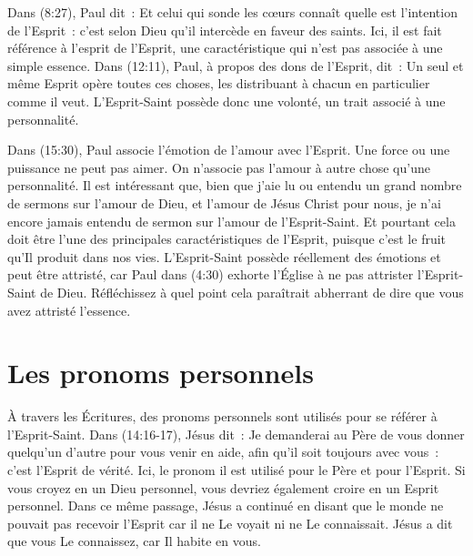 Dans (8:27), Paul dit~: \og Et celui qui sonde les cœurs
 connaît quelle est l'intention de l'Esprit~: c'est selon Dieu qu'il
 intercède en faveur des saints. \fg{} Ici, il est fait référence à l'esprit
  de l'Esprit, une caractéristique qui n'est pas associée à
 une simple essence. Dans (12:11), Paul, à propos des dons de
 l'Esprit, dit~: \og Un seul et même Esprit opère toutes ces choses, les
 distribuant à chacun en particulier comme il veut. \fg{} L'Esprit-Saint
 possède donc une volonté, un trait associé à une personnalité.

Dans (15:30), Paul associe l'émotion de l'amour avec l'Esprit.
 Une force ou une puissance ne peut pas aimer. On n'associe pas l'amour à autre
 chose qu'une personnalité. Il est intéressant que, bien que j'aie lu ou
 entendu un grand nombre de sermons sur l'amour de Dieu, et l'amour de
 Jésus Christ pour nous, je n'ai encore jamais entendu de sermon sur l'amour de
 l'Esprit-Saint. Et pourtant cela doit être l'une des principales
 caractéristiques de l'Esprit, puisque c'est le fruit qu'Il produit dans nos
 vies. L'Esprit-Saint possède réellement des émotions et peut être attristé,
 car Paul dans (4:30) exhorte l'Église à ne pas attrister
 l'Esprit-Saint de Dieu. Réfléchissez à quel point cela paraîtrait abherrant
 de dire que vous avez attristé l'essence.


\section*{Les pronoms personnels}

À travers les Écritures, des pronoms personnels sont utilisés pour se
 référer à l'Esprit-Saint. Dans (14:16-17), Jésus dit~:
 \og Je demanderai au Père de vous donner quelqu'un d'autre pour vous
 venir en aide, afin qu'il soit toujours avec vous~:
 c'est l'Esprit de vérité. \fg{}
 Ici, le pronom \og il \fg{} est utilisé pour le Père et pour l'Esprit.
 Si vous croyez en un Dieu personnel, vous devriez également croire en
 un Esprit personnel. Dans ce même passage, Jésus a continué en disant
 que le monde ne pouvait pas recevoir l'Esprit car il ne Le voyait ni
 ne Le connaissait. Jésus a dit que vous Le connaissez, car Il habite
 en vous.

